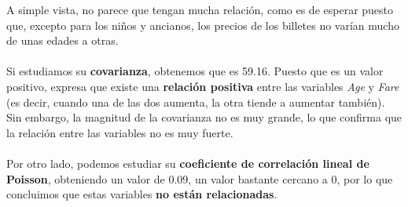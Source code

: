 \documentclass{article}
\begin{document}
\noindent A simple vista, no parece que tengan mucha relación, como es de esperar puesto que, excepto para los niños y ancianos, los precios de los billetes no varían mucho de unas edades a otras.\\\\
Si estudiamos su \textbf{covarianza}, obtenemos que es 59.16. Puesto que es un valor positivo, expresa que existe una\textbf{ relación positiva} entre las variables \textit{Age} y \textit{Fare} (es decir, cuando una de las dos aumenta, la otra tiende a aumentar también). Sin embargo, la magnitud de la covarianza no es muy grande, lo que confirma que la relación entre las variables no es muy fuerte.\\\\
Por otro lado, podemos estudiar su \textbf{coeficiente de correlación lineal de Poisson}, obteniendo un valor de 0.09, un valor bastante cercano a 0, por lo que concluimos que estas variables \textbf{no están relacionadas}.

\newpage
\end{document}
